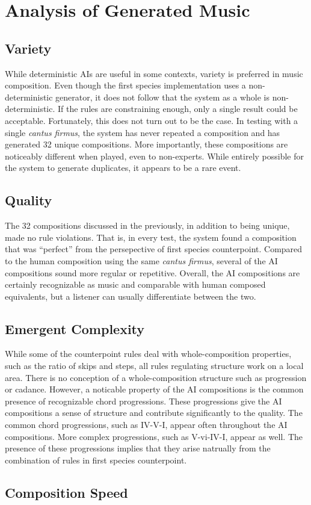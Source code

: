 \section{Analysis of Generated Music}

\subsection{Variety} 
While deterministic AIs are useful in some contexts, variety is preferred in music composition.
Even though the first species implementation uses a non-deterministic generator, it does not follow that the system as a whole is non-deterministic.
If the rules are constraining enough, only a single result could be acceptable.
Fortunately, this does not turn out to be the case.
In testing with a single \emph{cantus firmus}, the system has never repeated a composition and has generated 32 unique compositions.
More importantly, these compositions are noticeably different when played, even to non-experts.
While entirely possible for the system to generate duplicates, it appears to be a rare event.

\subsection{Quality} 
The 32 compositions discussed in the previously, in addition to being unique, made no rule violations.
That is, in every test, the system found a composition that was ``perfect'' from the persepective of first species counterpoint.
Compared to the human composition using the same \emph{cantus firmus}, several of the AI compositions sound more regular or repetitive.
Overall, the AI compositions are certainly recognizable as music and comparable with human composed equivalents, but a listener can usually differentiate between the two.

\subsection{Emergent Complexity} 
While some of the counterpoint rules deal with whole-composition properties, 
such as the ratio of skips and steps, all rules regulating structure work on a local area.
There is no conception of a whole-composition structure such as progression or cadance.
However, a noticable property of the AI compositions is the common presence of recognizable chord progressions.
These progressions give the AI compositions a sense of structure and contribute significantly to the quality.
The common chord progressions, such as IV-V-I, appear often throughout the AI compositions.
More complex progressions, such as V-vi-IV-I, appear as well.
The presence of these progressions implies that they arise natrually from the combination of rules in first species counterpoint.

\subsection{Composition Speed} 
